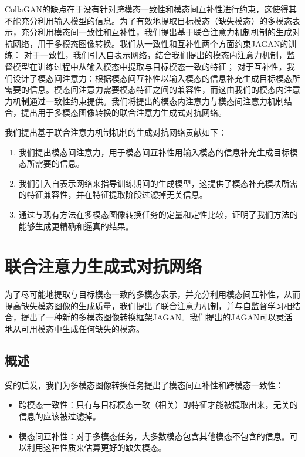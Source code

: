 CollaGAN的缺点在于没有针对跨模态一致性和模态间互补性进行约束，这使得其不能充分利用输入模型的信息。为了有效地提取目标模态（缺失模态）的多模态表示，充分利用模态间一致性和互补性，我们提出基于联合注意力机制机制的生成对抗网络，用于多模态图像转换。我们从一致性和互补性两个方面约束JAGAN的训练：
对于一致性，我们引入自表示网络，结合我们提出的模态内注意力机制，监督模型在训练过程中从输入模态中提取与目标模态一致的特征；
对于互补性，我们设计了模态间注意力：根据模态间互补性以输入模态的信息补充生成目标模态所需要的信息。模态间注意力需要模态特征之间的兼容性，而这由我们的模态内注意力机制通过一致性约束提供。我们将提出的模态内注意力与模态间注意力机制结合，提出用于多模态图像转换的联合注意力生成式对抗网络。


我们提出基于联合注意力机制机制的生成对抗网络贡献如下：

\begin{enumerate}
\item 我们提出模态间注意力，用于模态间互补性用输入模态的信息补充生成目标模态所需要的信息。
\item 我们引入自表示网络来指导训练期间的生成模型，这提供了模态补充模块所需的特征兼容性，并在特征提取阶段过滤掉无关信息。
\item 通过与现有方法在多模态图像转换任务的定量和定性比较，证明了我们方法的能够生成更精确和逼真的结果。
\end{enumerate}


\section{联合注意力生成式对抗网络}
为了尽可能地提取与目标模态一致的多模态表示，并充分利用模态间互补性，从而提高缺失模态图像的生成质量，我们提出了联合注意力机制，并与自监督学习相结合，提出了一种新的多模态图像转换框架JAGAN。我们提出的JAGAN可以灵活地从可用模态中生成任何缺失的模态。

\subsection{概述}

受\cite{zhang2020deep}的启发，我们为多模态图像转换任务提出了模态间互补性和跨模态一致性：
\begin{itemize}
    \item 跨模态一致性：只有与目标模态一致（相关）的特征才能被提取出来，无关的信息的应该被过滤掉。
    \item 模态间互补性：对于多模态任务，大多数模态包含其他模态不包含的信息。可以利用这种性质来估算更好的缺失模态。
\end{itemize}

